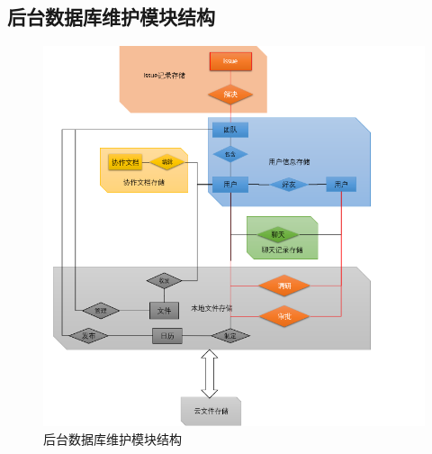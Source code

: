    \subsection{后台数据库维护模块结构}
\newpage
        \begin{figure}[h]
            \centering
            \includegraphics[scale=0.95]{OutlineDesign/figures/数据库存储结构.png}
            \caption{\color{red}后台数据库维护模块结构}
            \label{fig:server_flow}
        \end{figure}
    
